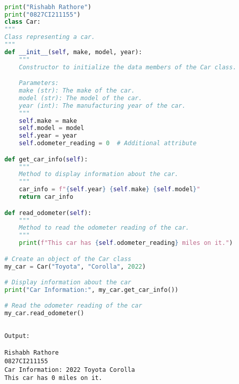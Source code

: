 \documentclass{report}
\begin{document}
\sol
\begin{lstlisting}[language=Python]

	print("Rishabh Rathore")
	print("0827CI211155")
	class Car:
    """
    Class representing a car.
    """
    def __init__(self, make, model, year):
        """
        Constructor to initialize the data members of the Car class.

        Parameters:
        make (str): The make of the car.
        model (str): The model of the car.
        year (int): The manufacturing year of the car.
        """
        self.make = make
        self.model = model
        self.year = year
        self.odometer_reading = 0  # Additional attribute

    def get_car_info(self):
        """
        Method to display information about the car.
        """
        car_info = f"{self.year} {self.make} {self.model}"
        return car_info

    def read_odometer(self):
        """
        Method to read the odometer reading of the car.
        """
        print(f"This car has {self.odometer_reading} miles on it.")

	# Create an object of the Car class
	my_car = Car("Toyota", "Corolla", 2022)

	# Display information about the car
	print("Car Information:", my_car.get_car_info())

	# Read the odometer reading of the car
	my_car.read_odometer()
  

\end{lstlisting}

\begin{verbatim}
	Output:

	Rishabh Rathore
	0827CI211155
	Car Information: 2022 Toyota Corolla
	This car has 0 miles on it.
	

\end{verbatim}


\bigskip
\end{document}

